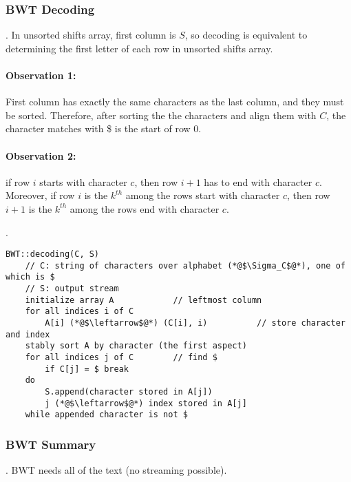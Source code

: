 \documentclass{article}
\begin{document}
\subsubsection{BWT Decoding} 

\begin{discovery}[].
    In unsorted shifts array, first column is $S$, so decoding is equivalent to determining the first letter of each row in unsorted shifts array. 
\end{discovery}

\paragraph{Observation 1:} First column has exactly the same characters as the last column, and they must be sorted. Therefore, after sorting the the characters and align them with $C$, the character matches with \$ is the start of row 0. 

\paragraph{Observation 2:} if row $i$ starts with character $c$, then row $i+1$ has to end with character $c$. Moreover, if row $i$ is the $k^{th}$ among the rows start with character $c$, then row $i+1$ is the $k^{th}$ among the rows end with character $c$. 

\begin{codes}[].
    \begin{lstlisting}[style=cppstyle, mathescape=false]
    BWT::decoding(C, S)
    // C: string of characters over alphabet (*@$\Sigma_C$@*), one of which is $
    // S: output stream
    initialize array A            // leftmost column
    for all indices i of C
        A[i] (*@$\leftarrow$@*) (C[i], i)          // store character and index
    stably sort A by character (the first aspect)
    for all indices j of C        // find $
        if C[j] = $ break
    do
        S.append(character stored in A[j])
        j (*@$\leftarrow$@*) index stored in A[j]
    while appended character is not $
    \end{lstlisting}
\end{codes}

\subsubsection{BWT Summary}

\begin{discovery}[].
    BWT needs all of the text (no streaming possible). 
\end{discovery} 
\end{document}
